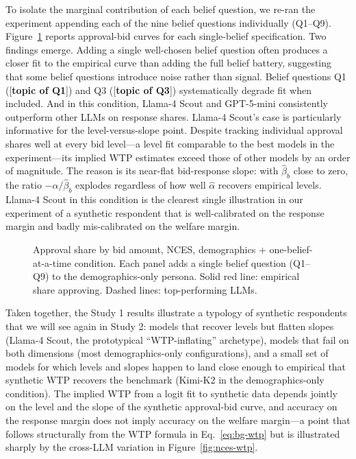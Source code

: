 \documentclass[12pt]{article}
\begin{document}
To isolate the marginal contribution of each belief question, we re-ran
the experiment appending each of the nine belief questions individually
(Q1--Q9). Figure~\ref{fig:nces-one-belief} reports approval-bid curves
for each single-belief specification. Two findings emerge. Adding a
single well-chosen belief question often produces a closer fit to the
empirical curve than adding the full belief battery, suggesting that
some belief questions introduce noise rather than signal. Belief
questions Q1 ([\textbf{topic of Q1}]) and Q3 ([\textbf{topic of Q3}])
systematically degrade fit when included. And in this condition, Llama-4
Scout and GPT-5-mini consistently outperform other LLMs on response
shares. Llama-4 Scout's case is particularly informative for the
level-versus-slope point. Despite tracking individual approval shares
well at every bid level---a level fit comparable to the best models in
the experiment---its implied WTP estimates exceed those of other models
by an order of magnitude. The reason is its near-flat bid-response
slope: with $\hat{\beta}_b$ close to zero, the ratio
$-\hat{\alpha}/\hat{\beta}_b$ explodes regardless of how well $\hat{\alpha}$
recovers empirical levels. Llama-4 Scout in this condition is the
clearest single illustration in our experiment of a synthetic respondent
that is well-calibrated on the response margin and badly mis-calibrated
on the welfare margin.

\begin{figure}[h]
    \centering
    \caption{Approval share by bid amount, NCES, demographics +
    one-belief-at-a-time condition. Each panel adds a single belief
    question (Q1--Q9) to the demographics-only persona. Solid red line:
    empirical share approving. Dashed lines: top-performing LLMs.}
    \label{fig:nces-one-belief}
\end{figure}

Taken together, the Study 1 results illustrate a typology of synthetic
respondents that we will see again in Study 2: models that recover
levels but flatten slopes (Llama-4 Scout, the prototypical
``WTP-inflating'' archetype), models that fail on both dimensions (most
demographics-only configurations), and a small set of models for which
levels and slopes happen to land close enough to empirical that
synthetic WTP recovers the benchmark (Kimi-K2 in the demographics-only
condition). The implied WTP from a logit fit to synthetic data depends
jointly on the level and the slope of the synthetic approval-bid curve,
and accuracy on the response margin does not imply accuracy on the
welfare margin---a point that follows structurally from the WTP formula
in Eq.~\ref{eq:bg-wtp} but is illustrated sharply by the cross-LLM
variation in Figure~\ref{fig:nces-wtp}.
\end{document}

